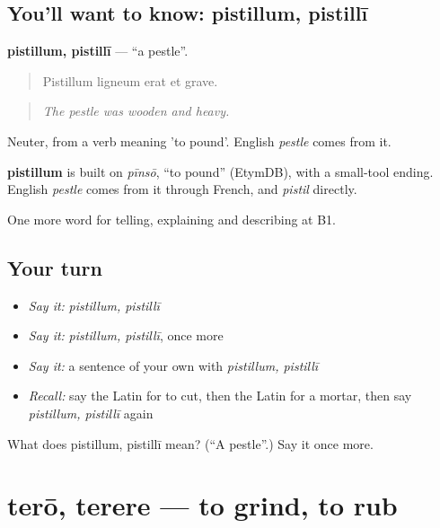 \subsection*{You'll want to know: pistillum, pistillī}
\textbf{pistillum, pistillī} — \textquotedblleft{}a pestle\textquotedblright{}.

\begin{quote}
Pistillum ligneum erat et grave.
\end{quote}

\begin{quote}
\emph{The pestle was wooden and heavy.}
\end{quote}

Neuter, from a verb meaning 'to pound'. English \emph{pestle} comes from it.

\begin{cousinweb}
\textbf{pistillum} is built on \emph{pīnsō}, \textquotedblleft{}to pound\textquotedblright{} (EtymDB), with a small-tool ending. English \emph{pestle} comes from it through French, and \emph{pistil} directly.
\end{cousinweb}

\begin{grammarlens}[title={What you've built}]
One more word for telling, explaining and describing at B1.
\end{grammarlens}

\subsection*{Your turn}
\begin{itemize}
\raggedright
  \item \emph{Say it:} \emph{pistillum, pistillī}
  \item \emph{Say it:} \emph{pistillum, pistillī}, once more
  \item \emph{Say it:} a sentence of your own with \emph{pistillum, pistillī}
  \item \emph{Recall:} say the Latin for to cut, then the Latin for a mortar, then say \emph{pistillum, pistillī} again
\end{itemize}

\begin{tcolorbox}[breakable,colback=teal!4,colframe=teal!35!black,title={Before you move on}]
What does pistillum, pistillī mean? (\textquotedblleft{}A pestle\textquotedblright{}.) Say it once more.
\end{tcolorbox}
\section[terō, terere]{terō, terere — to grind, to rub}

